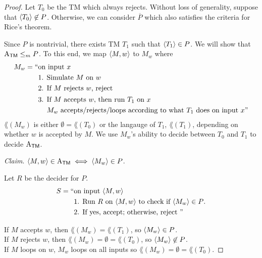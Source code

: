 \begin{proof}
    Let $T_0$ be the TM which always rejects. Without loss of generality, suppose that $\langle T_0 \rangle \not\in P$. Otherwise, we can consider $\overline{P}$ which also satisfies the criteria for Rice's theorem.
    
    Since $P$ is nontrivial, there exists TM $T_1$ such that $\langle T_1 \rangle \in P$. We will show that $\mathrm{A}_{\mathsf{TM}} \leq_m P$. To this end, we map $\langle M,w \rangle$ to $M_w$ where
    $$
    \begin{aligned}
        M_w = ``
        &\text{on input $x$} \\
        &\text{1. Simulate $M$ on $w$} \\
        &\text{2. If $M$ rejects $w$, reject} \\
        &\begin{aligned}
            \text{3. } &\text{If $M$ accepts $w$, then run $T_1$ on $x$} \\
            &\text{$M_w$ accepts/rejects/loops according to what $T_1$ does on input $x$}"
        \end{aligned}
    \end{aligned}
    $$
    $\lang(M_w)$ is either $\emptyset = \lang(T_0)$ or the langauge of $T_1$, $\lang(T_1)$, depending on whether $w$ is accepted by $M$. We use $M_w$'s ability to decide between $T_0$ and $T_1$ to decide $\mathrm{A}_{\mathsf{TM}}$.

    \textit{Claim}. $\langle M,w \rangle \in \mathrm{A}_{\mathsf{TM}} \iff \langle M_w \rangle \in P$.

    Let $R$ be the decider for $P$.
    $$
    \begin{aligned}
        S = ``&\text{on input $\langle M,w \rangle$} \\
        &\text{1. Run $R$ on $\langle M,w \rangle$ to check if $\langle M_w \rangle \in P$.} \\
        & \text{2. If yes, accept; otherwise, reject }"
    \end{aligned}
    $$

    If $M$ accepts $w$, then $\lang(M_w) = \lang(T_1)$, so $\langle M_w \rangle \in P$. \\
    If $M$ rejects $w$, then $\lang(M_w) = \emptyset = \lang(T_0)$, so $\langle M_w \rangle \not\in P$. \\
    If $M$ loops on $w$, $M_w$ loops on all inputs so $\lang(M_w) = \emptyset = \lang(T_0)$.
\end{proof}